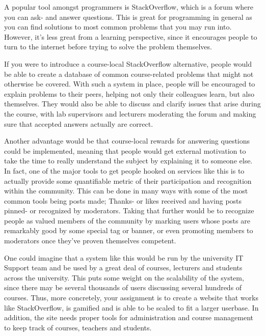 \begin{refsection}
A popular tool amongst programmers is StackOverflow, which is a forum where you can ask- and answer questions. This is great for programming in general as you can find solutions to most common problems that you may run into. However, it's less great from a learning perspective, since it encourages people to turn to the internet before trying to solve the problem themselves.

If you were to introduce a course-local StackOverflow alternative, people would be able to create a database of common course-related problems that might not otherwise be covered. With such a system in place, people will be encouraged to explain problems to their peers, helping not only their colleagues learn, but also themselves. They would also be able to discuss and clarify issues that arise during the course, with lab supervisors and lecturers moderating the forum and making sure that accepted answers actually are correct.

Another advantage would be that course-local rewards for answering questions could be implemented, meaning that people would get external motivation to take the time to really understand the subject by explaining it to someone else. In fact, one of the major tools to get people hooked on services like this is to actually provide some quantifiable metric of their participation and recognition within the community. This can be done in many ways with some of the most common tools being posts made; Thanks- or likes received and having posts pinned- or recognized by moderators. Taking that further would be to recognize people as valued members of the community by marking users whose posts are remarkably good by some special tag or banner, or even promoting members to moderators once they've proven themselves competent.

One could imagine that a system like this would be run by the university IT Support team and be used by a great deal of courses, lecturers and students across the university. This puts some weight on the scalability of the system, since there may be several thousands of users discussing several hundreds of courses. Thus, more concretely, your assignment is to create a website that works like StackOverflow, is gamified and is able to be scaled to fit a larger userbase. In addition, the site needs proper tools for administration and course management to keep track of courses, teachers and students.


\end{refsection}
